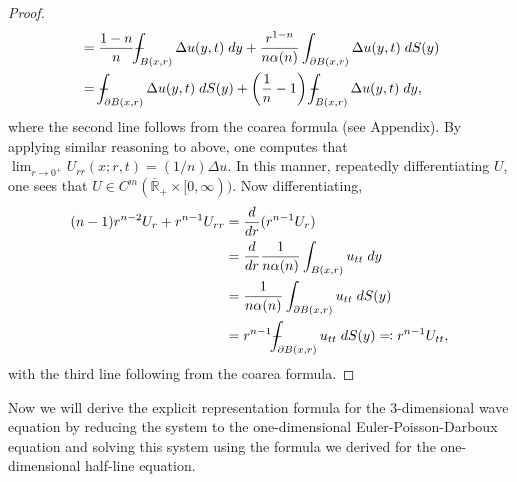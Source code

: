 \documentclass{article}
\def\Xint#1{\mathchoice
	{\XXint\displaystyle\textstyle{#1}}%
	{\XXint\textstyle\scriptstyle{#1}}%
	{\XXint\scriptstyle\scriptscriptstyle{#1}}%
	{\XXint\scriptscriptstyle\scriptscriptstyle{#1}}%
	\!\int}
\def\XXint#1#2#3{{\setbox0=\hbox{$#1{#2#3}{\int}$ }
		\vcenter{\hbox{$#2#3$ }}\kern-0.6\wd0}}
\def\dashint{\Xint-}
\numberwithin{equation}{section}
\begin{document}
\begin{proof}
\begin{align*}
\begin{split}
				&= \frac{1 - n}{n}\dashint_{B(x, r)}\Delta u(y,t)\;dy + \frac{r^{1-n}}{n\alpha(n)}\int_{\partial B(x, r)}\Delta u(y,t)\;dS(y) \\
				&= \dashint_{\partial B(x, r)}\Delta u(y, t)\;dS(y) + \left(\frac{1}{n} - 1\right)\dashint_{B(x, r)}\Delta u(y, t)\;dy, 
			\end{split}
		\end{align*}
		where the second line follows from the coarea formula (see Appendix). By applying similar reasoning to above, one computes that $\lim_{r \to 0^{+}}U_{rr}(x;r, t) = (1/n)\Delta u$. In this manner, repeatedly differentiating $U$, one sees that $U \in C^{m}(\overline{\mathbb{R}}_{+} \times [0, \infty))$. Now differentiating, 
		\begin{align*}
			\begin{split}
				(n-1)r^{n - 2}U_{r} + r^{n-1}U_{rr} &= \frac{d}{dr}(r^{n-1}U_{r}) \\
				&= \frac{d}{dr}\frac{1}{n\alpha(n)}\int_{B(x,r)}u_{tt}\;dy  \\
				&= \frac{1}{n\alpha(n)}\int_{\partial B(x,r)}u_{tt}\;dS(y)  \\
				&= r^{n-1}\dashint_{\partial B(x, r)}u_{tt}\;dS(y) \eqqcolon r^{n-1}U_{tt}, 
			\end{split}
		\end{align*}
		with the third line following from the coarea formula. 
	\end{proof}
	
	Now we will derive the explicit representation formula for the 3-dimensional wave equation by reducing the system to the one-dimensional Euler-Poisson-Darboux equation and solving this system using the formula we derived for the one-dimensional half-line equation. 
	
\end{document}
